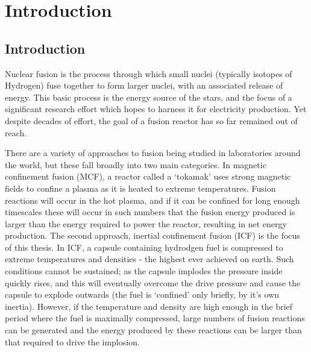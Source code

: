 

\chapter{Introduction} 

\minitoc


\section{Introduction}
Nuclear fusion is the process through which small nuclei (typically isotopes of Hydrogen) fuse together to form larger nuclei, with an associated release of energy. This basic process is the energy source of the stars, and the focus of a significant research effort which hopes to harness it for electricity production. Yet despite decades of effort, the goal of a fusion reactor has so far remained out of reach.

There are a variety of approaches to fusion being studied in laboratories around the world, but these fall broadly into two main categories. In magnetic confinement fusion (MCF), a reactor called a `tokamak' uses strong magnetic fields to confine a plasma as it is heated to extreme temperatures. Fusion reactions will occur in the hot plasma, and if it can be confined for long enough timescales these will occur in such numbers that the fusion energy produced is larger than the energy required to power the reactor, resulting in net energy production. The second approach, inertial confinement fusion (ICF) is the focus of this thesis. In ICF, a capsule containing hydrodgen fuel is compressed to extreme temperatures and densities - the highest ever achieved on earth. Such conditions cannot be sustained; as the capsule implodes the pressure inside quickly rises, and this will eventually overcome the drive pressure and cause the capsule to explode outwards (the fuel is `confined' only briefly, by it's own inertia). However, if the temperature and density are high enough in the brief period where the fuel is maximally compressed, large numbers of fusion reactions can be generated and the energy produced by these reactions can be larger than that required to drive the implosion. 


